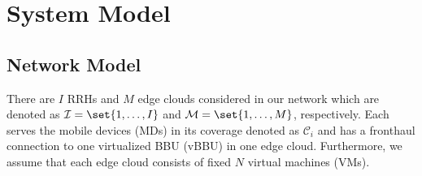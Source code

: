 \section{System Model}
\label{sec:model}

\subsection{Network Model}
There are $I$ RRHs and $M$ edge clouds considered in our network which are denoted as $\mathcal{I}=\set{1,\dots,I}$ and $\mathcal{M}=\set{1,\dots,M}$, respectively.
Each serves the mobile devices (MDs) in its coverage denoted as $\mathcal{C}_{i}$ and has a fronthaul connection to one virtualized BBU (vBBU) in one edge cloud.
Furthermore, we assume that each edge cloud consists of fixed $N$ virtual machines (VMs).

